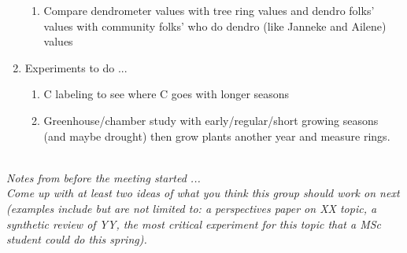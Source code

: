 \documentclass[11pt,letter]{article}
\begin{document}
\begin{enumerate}
\begin{enumerate}
\item Compare dendrometer values with tree ring values and dendro folks' values with community folks' who do dendro (like Janneke and Ailene) values
\end{enumerate}
\item Experiments to do ... 
\begin{enumerate}
\item C labeling to see where C goes with longer seasons
\item Greenhouse/chamber study with early/regular/short growing seasons (and maybe drought) then grow plants another year and measure rings. 
\end{enumerate}
\end{enumerate}

\vspace{5ex}\\
\emph{Notes from before the meeting started ... }\\

\emph{Come up with at least two ideas of what you think this group should work on next (examples include but are not limited to: a perspectives paper on XX topic, a synthetic review of YY, the most critical experiment for this topic that a MSc student could do this spring).}
\end{document}

